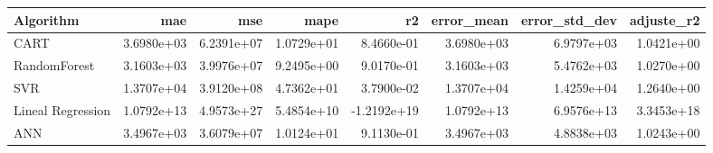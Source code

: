 \begin{tabular}{lrrrrrrr}
\toprule
Algorithm & mae & mse & mape & r2 & error_mean & error_std_dev & adjuste_r2 \\
\midrule
CART & 3.6980e+03 & 6.2391e+07 & 1.0729e+01 & 8.4660e-01 & 3.6980e+03 & 6.9797e+03 & 1.0421e+00 \\
RandomForest & 3.1603e+03 & 3.9976e+07 & 9.2495e+00 & 9.0170e-01 & 3.1603e+03 & 5.4762e+03 & 1.0270e+00 \\
SVR & 1.3707e+04 & 3.9120e+08 & 4.7362e+01 & 3.7900e-02 & 1.3707e+04 & 1.4259e+04 & 1.2640e+00 \\
Lineal Regression & 1.0792e+13 & 4.9573e+27 & 5.4854e+10 & -1.2192e+19 & 1.0792e+13 & 6.9576e+13 & 3.3453e+18 \\
ANN & 3.4967e+03 & 3.6079e+07 & 1.0124e+01 & 9.1130e-01 & 3.4967e+03 & 4.8838e+03 & 1.0243e+00 \\
\bottomrule
\end{tabular}
